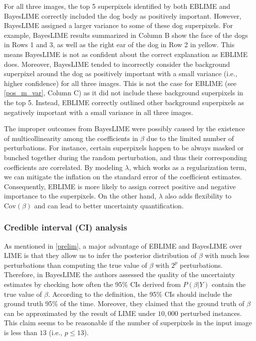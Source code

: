 \documentclass{article}
\theoremstyle{plain}
\theoremstyle{definition}
\theoremstyle{remark}
\begin{document}
For all three images, the top 5 superpixels identified by both EBLIME and BayesLIME correctly included the dog body as positively important. However, BayesLIME assigned a larger variance to some of these dog superpixels. For example, BayesLIME results summarized in Column B show the face of the dogs in Rows 1 and 3, as well as the right ear of the dog in Row 2 in yellow. This means BayesLIME is not as confident about the correct explanation as EBLIME does. Moreover, BayesLIME tended to incorrectly consider the background superpixel around the dog as positively important with a small variance (i.e., higher confidence) for all three images. This is not the case for EBLIME (see \cref{pos_m_var}, Column C) as it did not include these background superpixels in the top 5. Instead, EBLIME correctly outlined other background superpixels as negatively important with a small variance in all three images.

The improper outcomes from BayesLIME were possibly caused by the existence of multicollinearity \cite{james2013} among the coefficients in $\beta$ due to the limited number of perturbations. For instance, certain superpixels happen to be always masked or bunched together during the random perturbation, and thus their corresponding coefficients are correlated. By modeling $\lambda$, which works as a regularization term, we can mitigate the inflation on the standard error of the coefficient estimates. Consequently, EBLIME is more likely to assign correct positive and negative importance to the superpixels. On the other hand, $\lambda$ also adds flexibility to $\textrm{Cov}(\beta)$ and can lead to better uncertainty quantification. 

\subsubsection{Credible interval (CI) analysis}
As mentioned in \cref{prelim}, a major advantage of EBLIME and BayesLIME over LIME is that they allow us to infer the posterior distribution of $\beta$ with much less perturbations than computing the true value of $\beta$ with $2^p$ perturbations. Therefore, in BayesLIME \cite{bayeslime} the authors assessed the quality of the uncertainty estimates by checking how often the 95\% CIs derived from $P(\beta|Y)$ contain the true value of $\beta$. According to the definition, the 95\% CIs should include the ground truth 95\% of the time. Moreover, they claimed that the ground truth of $\beta$ can be approximated by the result of LIME under $10,000$ perturbed instances. This claim seems to be reasonable if the number of superpixels in the input image is less than $13$ (i.e., $p\leq13$). 
\end{document}
